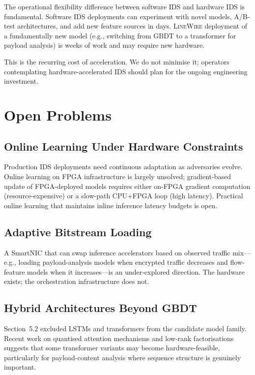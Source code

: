 \documentclass[sigconf,nonacm]{acmart}
\begin{document}
The operational flexibility difference between software IDS and
hardware IDS is fundamental. Software IDS deployments can experiment with
novel models, A/B-test architectures, and add new feature sources
in days. \textsc{LineWire} deployment of a fundamentally new model
(e.g., switching from GBDT to a transformer for payload analysis) is
weeks of work and may require new hardware.

This is the recurring cost of acceleration. We do not minimise it;
operators contemplating hardware-accelerated IDS should plan for the
ongoing engineering investment.

\section{Open Problems}

\subsection{Online Learning Under Hardware Constraints}

Production IDS deployments need continuous adaptation as adversaries
evolve. Online learning on FPGA infrastructure is largely unsolved;
gradient-based update of FPGA-deployed models requires either
on-FPGA gradient computation (resource-expensive) or a slow-path
CPU+FPGA loop (high latency). Practical online learning that maintains
inline inference latency budgets is open.

\subsection{Adaptive Bitstream Loading}

A SmartNIC that can swap inference accelerators based on observed
traffic mix---e.g., loading payload-analysis models when encrypted
traffic decreases and flow-feature models when it increases---is an
under-explored direction. The hardware exists; the orchestration
infrastructure does not.

\subsection{Hybrid Architectures Beyond GBDT}

Section~5.2 excluded LSTMs and transformers from the candidate model
family. Recent work on quantised attention mechanisms and low-rank
factorisations suggests that some transformer variants may become
hardware-feasible, particularly for payload-content analysis where
sequence structure is genuinely important.
\end{document}
